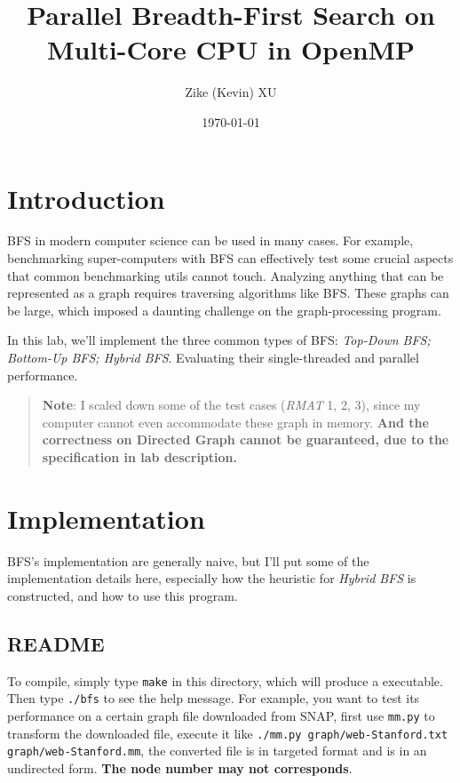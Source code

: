 \documentclass[12pt]{article}
\title{Parallel Breadth-First Search on Multi-Core CPU in OpenMP}
\author{Zike (Kevin) XU \quad 2020533081}
\date{\today}
\begin{document}
\maketitle

\section{Introduction}
 {\scshape BFS} in modern computer science can be used in many cases. For example, benchmarking super-computers with BFS can effectively test some crucial aspects that common benchmarking utils cannot touch. Analyzing anything that can be represented as a graph requires traversing algorithms like BFS. These graphs can be large, which imposed a daunting challenge on the graph-processing program.


In this lab, we'll implement the three common types of BFS: \textit{\color{MaterialBlueGrey} Top-Down BFS; Bottom-Up BFS; Hybrid BFS}. Evaluating their single-threaded and parallel performance.

\begin{quote}
	\textbf{Note}: I scaled down some of the test cases (\textit{RMAT} 1, 2, 3), since my computer cannot even accommodate these graph in memory. \textbf{And the correctness on Directed Graph cannot be guaranteed, due to the specification in lab description.}
\end{quote}

\section{Implementation}

BFS's implementation are generally naive, but I'll put some of the implementation details here, especially how the heuristic\cite{6468458} for \textit{Hybrid BFS} is constructed, and how to use this program.

\subsection{README}

To compile, simply type \texttt{make} in this directory, which will produce a executable. Then type \texttt{./bfs} to see the help message. For example, you want to test its performance on a certain graph file downloaded from SNAP, first use \texttt{mm.py} to transform the downloaded file, execute it like \texttt{./mm.py graph/web-Stanford.txt graph/web-Stanford.mm}, the converted file is in targeted format and is in an undirected form. \textbf{The node number may not corresponds}.
\end{document}
